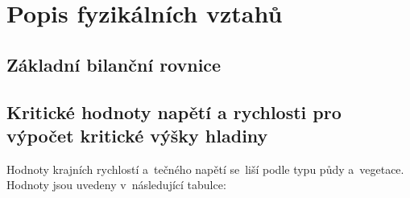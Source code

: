 \chapter{Popis fyzikálních vztahů} \label{chapter:vztahy}

\section{Základní bilanční rovnice} \label{section:bilancnirovnice}
\newpage
\section{Kritické hodnoty napětí a rychlosti pro výpočet kritické výšky hladiny} \label{section:kritickehodnoty}
Hodnoty krajních rychlostí a~tečného napětí se~liší podle typu půdy a~vegetace. Hodnoty jsou uvedeny v~následující tabulce:
